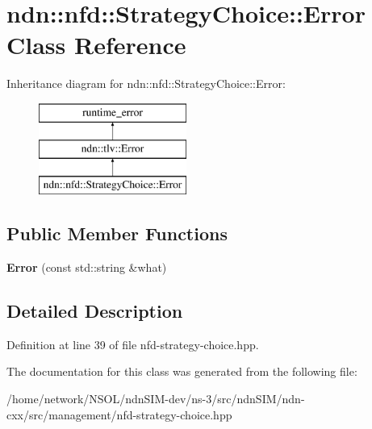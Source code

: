 \hypertarget{classndn_1_1nfd_1_1StrategyChoice_1_1Error}{}\section{ndn\+:\+:nfd\+:\+:Strategy\+Choice\+:\+:Error Class Reference}
\label{classndn_1_1nfd_1_1StrategyChoice_1_1Error}
Inheritance diagram for ndn\+:\+:nfd\+:\+:Strategy\+Choice\+:\+:Error\+:\begin{figure}[H]
\begin{center}
\leavevmode
\includegraphics[height=3.000000cm]{classndn_1_1nfd_1_1StrategyChoice_1_1Error}
\end{center}
\end{figure}
\subsection*{Public Member Functions}
\begin{DoxyCompactItemize}
\item 
{\bfseries Error} (const std\+::string \&what)\hypertarget{classndn_1_1nfd_1_1StrategyChoice_1_1Error_a261b2e00f613104766e5677df2f86402}{}\label{classndn_1_1nfd_1_1StrategyChoice_1_1Error_a261b2e00f613104766e5677df2f86402}

\end{DoxyCompactItemize}


\subsection{Detailed Description}


Definition at line 39 of file nfd-\/strategy-\/choice.\+hpp.



The documentation for this class was generated from the following file\+:\begin{DoxyCompactItemize}
\item 
/home/network/\+N\+S\+O\+L/ndn\+S\+I\+M-\/dev/ns-\/3/src/ndn\+S\+I\+M/ndn-\/cxx/src/management/nfd-\/strategy-\/choice.\+hpp\end{DoxyCompactItemize}
